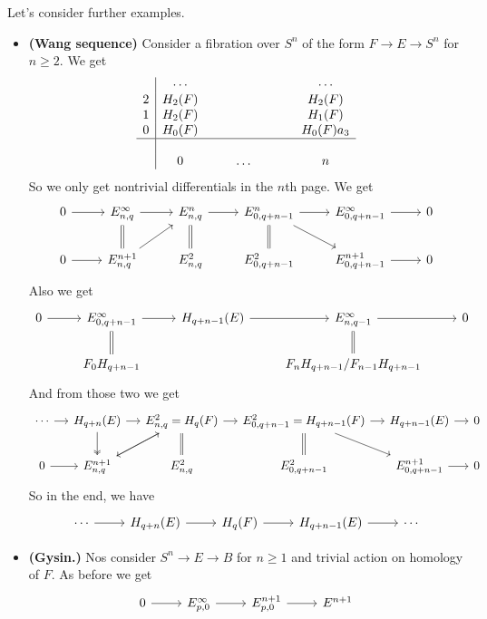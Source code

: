 \documentclass{article}
\begin{document}
Let's consider further examples.
\begin{examples}\leavevmode
	\begin{itemize}
		\item \textbf{(Wang sequence)} Consider a fibration over $S^n$ of the form $F\to E\to S^n$ for $n\geq2$. We get
			\begin{align*}
			\begin{array}{c|cccccccc}
				&\cdots&&&&&&&\cdots\\
				2&H_2(F)&&&&&&&H_2(F)\\
				1&H_2(F)&&&&&&&H_1(F)\\
				0&H_0(F)&&&&&&&H_0(F) a_3\\
				\hline\\
				&0&&&\ldots&&&&n
			\end{array}
		\end{align*}
		So we only get nontrivial differentials in the $n$th page. We get
		\begin{equation}
			\begin{tikzcd}
			0\arrow[r]&E^\infty_{n,q}\arrow[d,equal]\arrow[r]&E^n_{n,q}\arrow[r]&E^n_{0,q+n-1}\arrow[r]\arrow[dr]&E^\infty_{0,q+n-1}\arrow[r]&0\\
			0\arrow[r]&E^{n+1}_{n,q}\arrow[ur]&E^2_{n,q}\arrow[u,equal]&E^{2}_{0,q+n-1}\arrow[u,equal]&E^{n+1}_{0,q+n-1}\arrow[r]&0
		\end{tikzcd}
		\end{equation}
		Also we get
		\begin{equation*}
			\begin{tikzcd}
				0\arrow[r]&E^\infty_{0,q+n-1}\arrow[d,equal]\arrow[r]&H_{q+n-1}(E)\arrow[r]&E^\infty_{n,q-1}\arrow[r]\arrow[d,equal]&0\\
				&F_0H_{q+n-1}&&F_nH_{q+n-1}/F_{n-1}H_{q+n-1}
			\end{tikzcd}
		\end{equation*}
		And from those two we get
		\begin{equation}
		\begin{tikzcd}[column sep=small]
			\cdots\arrow[r]&H_{q+n}(E)\arrow[d,two heads]\arrow[r]&E^2_{n,q}=H_q(F)\arrow[dl]\arrow[r]&E^2_{0,q+n-1}=H_{q+n-1}(F)\arrow[r]\arrow[dr]&H_{q+n-1}(E)\arrow[r]&0\\
			0\arrow[r]&E^{n+1}_{n,q}\arrow[ur]&E^2_{n,q}\arrow[u,equal]&E^{2}_{0,q+n-1}\arrow[u,equal]&E^{n+1}_{0,q+n-1}\arrow[r]&0
		\end{tikzcd}
		\end{equation}
		So in the end, we have
		\[\begin{tikzcd}
			\cdots\arrow[r]&H_{q+n}(E)\arrow[r]&H_q(F)\arrow[r]&H_{q+n-1}(E)\arrow[r]&\cdots
		\end{tikzcd}\]
		\item \textbf{(Gysin.)} Nos consider $S^n\to E\to B$ for $n\geq 1$ and trivial action on homology of $F$. As before we get
		\[\begin{tikzcd}
			0\arrow[r]&E^\infty_{p,0}\arrow[r]&E^{n+1}_{p,0}\arrow[r]&E^{n+1}
		\end{tikzcd}\]
	\end{itemize}
\end{examples}
\end{document}
